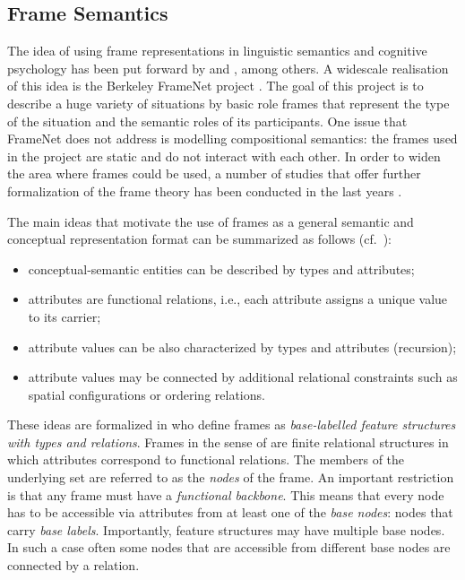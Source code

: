 \subsection{Frame Semantics}
The idea of using frame representations in linguistic semantics and cognitive
psychology has been put forward by \citet{Fillmore:82} and
\citet{Barsalou:92}, among others. A widescale realisation of this idea is the Berkeley FrameNet project \citep{Fillmore:03}. The goal of this project is to describe a huge variety of situations by basic role frames that represent the type of the situation and the semantic roles of its participants. One issue that FrameNet does not address is modelling compositional semantics: the frames used in the project are static and do not interact with each other. In order to widen the area where frames could be used, a number of studies that offer further formalization of the frame theory has been conducted in the last years \citep[][among others]{Petersen:07, PetersenOsswald:10, KallmeyerOsswald:12, KallmeyerOsswald:13, KallmeyerOsswaldPogodalla:15, Loebner:2014}.

The main ideas that motivate the use of frames as a general semantic and conceptual representation format can be summarized as follows (cf.\ \citealt{Loebner:2014}):
\begin{itemize}
\item conceptual-semantic entities can be described by types and
attributes;
\item attributes are functional relations, i.e., each attribute assigns a unique
value to its carrier;
\item attribute values can be also characterized by types and attributes (recursion);
\item attribute values may be connected by additional relational constraints \citep{Barsalou:92} such as spatial configurations or ordering relations.
\end{itemize}

These ideas are formalized in \citet{KallmeyerOsswald:13} who define frames
as \emph{base-labelled feature structures with types and relations}.
Frames in the sense of \citet{KallmeyerOsswald:13} are finite relational structures in which attributes correspond to functional relations. The members of the underlying set are referred to as the \emph{nodes} of the frame. An important restriction is that any frame must have a \emph{functional
backbone}. This means that every node has to be accessible via attributes
from at least one of the \emph{base nodes}: nodes that carry \emph{base labels}. Importantly, feature structures may have multiple base nodes. In such a case often some nodes that are accessible from different base nodes are connected by a relation.

